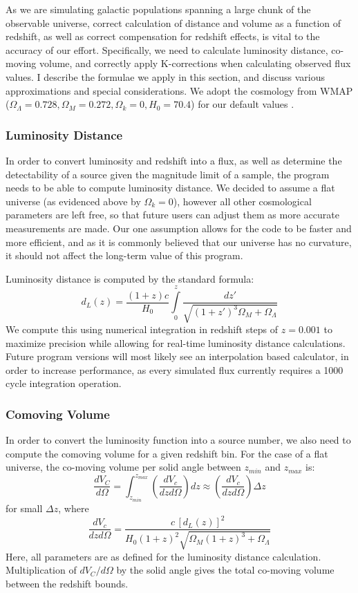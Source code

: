 \documentclass[twocolumn,letterpaper,10pt]{article}
\begin{document}
As we are simulating galactic populations spanning a large chunk of the observable universe, correct calculation of distance and volume as a function of redshift, as well as correct compensation for redshift effects, is vital to the accuracy of our effort. Specifically, we need to calculate luminosity distance, co-moving volume, and correctly apply K-corrections when calculating observed flux values. I describe the formulae we apply in this section, and discuss various approximations and special considerations. We adopt the cosmology from WMAP ($\Omega_{\Lambda}=0.728, \Omega_{M}=0.272, \Omega_k=0, H_0=70.4$) for our default values \citep{Komatsu11}.

\subsubsection{Luminosity Distance}
In order to convert luminosity and redshift into a flux, as well as determine the detectability of a source given the magnitude limit of a sample, the program needs to be able to compute luminosity distance. We decided to assume a flat universe (as evidenced above by $\Omega_k=0$), however all other cosmological parameters are left free, so that future users can adjust them as more accurate measurements are made. Our one assumption allows for the code to be faster and more efficient, and as it is commonly believed that our universe has no curvature, it should not affect the long-term value of this program.

Luminosity distance is computed by the standard formula:
$$
d_L(z)=\frac{(1+z)c}{H_0}\int\limits_0^z\frac{dz'}{\sqrt{(1+z')^3\Omega_M+\Omega_\Lambda}}
$$
We compute this using numerical integration in redshift steps of $z=0.001$ to maximize precision while allowing for real-time luminosity distance calculations. Future program versions will most likely see an interpolation based calculator, in order to increase performance, as every simulated flux currently requires a 1000 cycle integration operation.

\subsubsection{Comoving Volume}
In order to convert the luminosity function into a source number, we also need to compute the comoving volume for a given redshift bin. For the case of a flat universe, the co-moving volume per solid angle between $z_{min}$ and $z_{max}$ is:
$$
\frac{dV_C}{d\Omega}=\int_{z_{min}}^{z_{max}}\left(\frac{dV_c}{dz d\Omega}\right)dz\approx \left(\frac{dV_c}{dz d\Omega}\right)\Delta z
$$
for small $\Delta z$, where
$$
\frac{dV_c}{dzd\Omega}=\frac{c\,\left[d_L(z)\right]^2}{H_0 (1+z)^2 \sqrt{\Omega_M(1+z)^3+\Omega_{\Lambda}}}
$$
Here, all parameters are as defined for the luminosity distance calculation. Multiplication of $dV_C/d\Omega$ by the solid angle gives the total co-moving volume between the redshift bounds.
\end{document}
